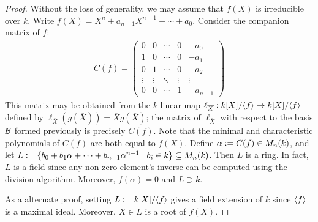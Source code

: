 \begin{proof}
    Without the loss of generality, we may assume that $f(X)$ is irreducible over $k$. Write $f(X) = X^{n} + a_{n-1}X^{n-1} + \cdots + a_{0}$. Consider the companion matrix of $f$:
    \begin{align}
        C(f) = \begin{pmatrix}
            0 & 0 & \cdots & 0 & -a_{0} \\
            1 & 0 & \cdots & 0 & -a_{1} \\
            0 & 1 & \cdots & 0 & -a_{2} \\
            \vdots & \vdots & \ddots & \vdots & \vdots \\
            0 & 0 & \cdots & 1 & -a_{n-1}
        \end{pmatrix}
    \end{align}
    This matrix may be obtained from the $k$-linear map $\ell_{\overline{X}} : k[X]/\langle f\rangle \to k[X]/\langle f\rangle$ defined by $\ell_{\overline{X}}(g(\overline{X})) = \overline{X}g(\overline{X})$; the matrix of $\ell_{\overline{X}}$ with respect to the basis $\mathcal{B}$ formed previously is precisely $C(f)$. Note that the minimal and characteristic polynomials of $C(f)$ are both equal to $f(X)$. Define $\alpha \vcentcolon= C(f) \in M_{n}(k)$, and let $L \vcentcolon= \{b_{0}+b_{1}\alpha + \cdots + b_{n-1}\alpha^{n-1} \mid b_{i} \in k\} \subseteq M_{n}(k)$. Then $L$ is a ring. In fact, $L$ is a field since any non-zero element's inverse can be computed using the division algorithm. Moreover, $f(\alpha) = 0$ and $L \supset k$.

    As a alternate proof, setting $L \vcentcolon= k[X]/\langle f\rangle$ gives a field extension of $k$ since $\langle f\rangle$ is a maximal ideal. Moreover, $\overline{X} \in L$ is a root of $f(X)$.
\end{proof}


